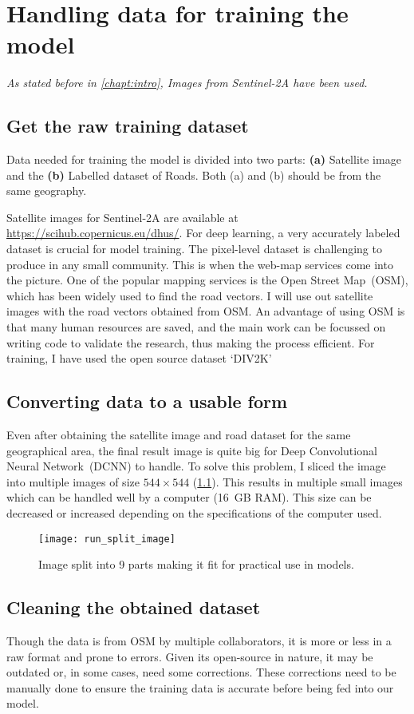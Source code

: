 \chapter{Handling data for training the model}\label{chapt:data}
\textit{As stated before in \cref{chapt:intro}, Images from Sentinel-2A have been used.}

\section{Get the raw training dataset}
Data needed for training the model is divided into two parts: \textbf{(a)} Satellite image and the \textbf{(b)} Labelled dataset of Roads. Both (a) and (b) should be from the same geography.

Satellite images for Sentinel-2A are available at \url{https://scihub.copernicus.eu/dhus/}. For deep learning, a very accurately labeled dataset is crucial for model training. The pixel-level dataset is challenging to produce in any small community. This is when the web-map services come into the picture. One of the popular mapping services is the Open Street Map~(OSM), which has been widely used to find the road vectors. I will use out satellite images with the road vectors obtained from OSM. An advantage of using OSM is that many human resources are saved, and the main work can be focussed on writing code to validate the research, thus making the process efficient. For training, I have used the open source dataset `DIV2K'


\section{Converting data to a usable form}
Even after obtaining the satellite image and road dataset for the same geographical area, the final result image is quite big for Deep Convolutional Neural Network~(DCNN) to handle. To solve this problem, I sliced the image into multiple images of size $544\times544$ (\cref{fig:run_split_images}). This results in multiple small images which can be handled well by a computer (16~GB RAM). This size can be decreased or increased depending on the specifications of the computer used.
\begin{figure}[h!]
  \centering
  \texttt{[image: run\_split\_image]}
  \caption{Image split into 9 parts making it fit for practical use in models.}
  \label{fig:run_split_images}
\end{figure}


\section{Cleaning the obtained dataset}
Though the data is from OSM by multiple collaborators, it is more or less in a raw format and prone to errors. Given its open-source in nature, it may be outdated or, in some cases, need some corrections. These corrections need to be manually done to ensure the training data is accurate before being fed into our model.

